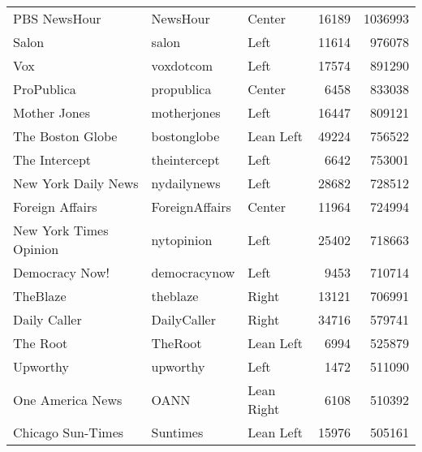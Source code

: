 \begin{tabular}{lllrr}
                             PBS NewsHour &         NewsHour &        Center &             16189 &    1036993 \\
                                    Salon &            salon &          Left &             11614 &     976078 \\
                                      Vox &        voxdotcom &          Left &             17574 &     891290 \\
                               ProPublica &       propublica &        Center &              6458 &     833038 \\
                             Mother Jones &      motherjones &          Left &             16447 &     809121 \\
                         The Boston Globe &      bostonglobe &     Lean Left &             49224 &     756522 \\
                            The Intercept &     theintercept &          Left &              6642 &     753001 \\
                      New York Daily News &      nydailynews &          Left &             28682 &     728512 \\
                          Foreign Affairs &   ForeignAffairs &        Center &             11964 &     724994 \\
                   New York Times Opinion &       nytopinion &          Left &             25402 &     718663 \\
                           Democracy Now! &     democracynow &          Left &              9453 &     710714 \\
                                 TheBlaze &         theblaze &         Right &             13121 &     706991 \\
                             Daily Caller &      DailyCaller &         Right &             34716 &     579741 \\
                                 The Root &          TheRoot &     Lean Left &              6994 &     525879 \\
                                 Upworthy &         upworthy &          Left &              1472 &     511090 \\
                         One America News &             OANN &    Lean Right &              6108 &     510392 \\
                        Chicago Sun-Times &         Suntimes &     Lean Left &             15976 &     505161 \\

\end{tabular}
